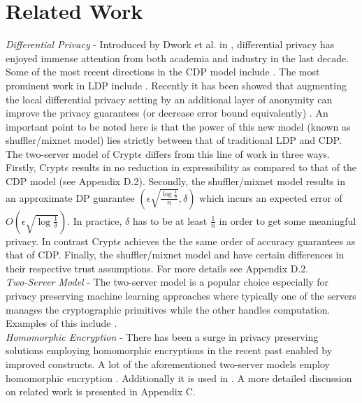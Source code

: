 \section{Related Work }
\textit{Differential Privacy }- Introduced by Dwork et al. in \cite{Dork}, differential privacy has enjoyed immense attention from both academia and industry in the last decade. Some of the most recent directions in the \textsf{CDP} model include \cite{MVG,Blocki,AHP,DAWA,hist1,hist2,hist3,hist4,hist6,hist7,hist8,A1,A2,A3,A4,A5,A6,A7,A8,u1,u2,MWEM}. The most prominent work in \textsf{LDP} include \cite{LDP1, LDP2, Rappor1,HH,Rappor2,HH2,Cormode, CALM,15,itemset}.
Recently it has been showed that augmenting the local differential privacy setting by an additional layer of anonymity can improve the privacy
guarantees (or decrease error bound equivalently) \cite{mixnets,Prochlo,amplification}.  An important point to be noted here is that the power of this new model (known as shuffler/mixnet model) lies strictly between that of traditional \textsf{LDP} and \textsf{CDP}. The two-server model of Crypt$\epsilon$ differs from this line of work in three ways. Firstly, Crypt$\epsilon$ results in no reduction in expressibility as compared to that of the \textsf{CDP} model (see Appendix D.2). Secondly, the shuffler/mixnet model results in an approximate DP guarantee $(\epsilon\sqrt{\frac{\log\frac{1}{\delta}}{n}},\delta)$ which incurs an expected error of $O(\epsilon\sqrt{\log\frac{1}{\delta}})$.  In practice, $\delta$ has to be at least $\frac{1}{n}$ in order to get some meaningful privacy. In contrast Crypt$\epsilon$ achieves the the same order of accuracy guarantees as that of \textsf{CDP}. Finally, the shuffler/mixnet model and \system have certain differences in their respective trust assumptions. For more details see Appendix D.2. %
\\\textit{Two-Server Model} - The two-server model is a popular choice especially for privacy preserving machine learning approaches where typically one of the servers manages the cryptographic primitives while the other handles computation. Examples of this include \cite{Boneh1,Boneh2,Ridge2,Matrix2,secureML,LReg,Ver}. \\\textit{Homomorphic Encryption } - There has been a surge in  privacy preserving solutions employing homomorphic encryptions in the recent past enabled by improved constructs. A lot of the aforementioned two-server models employ homomorphic encryption \cite{Boneh1,Boneh2,LReg,Matrix2}.  Additionally it is used in \cite{CryptoDL,CryptoNet,NN, Irene2, grid}.
A more detailed discussion on related work is presented in Appendix C.

